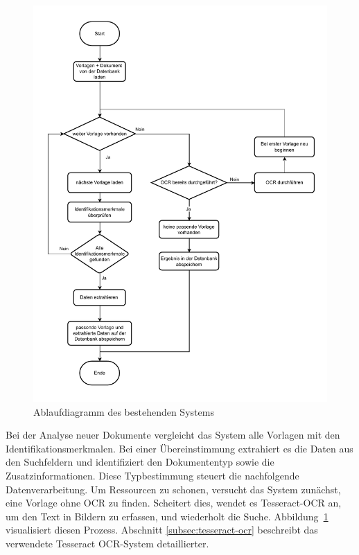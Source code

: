 \begin{figure}
	\centering
	\includegraphics[width=\textwidth]{images/AuswertungBestehendesSystem.drawio.pdf}
	\caption{Ablaufdiagramm des bestehenden Systems}
	\label{fig:auswertung-bestehendes-system}
\end{figure}

Bei der Analyse neuer Dokumente vergleicht das System alle Vorlagen mit den Identifikationsmerkmalen. Bei einer Übereinstimmung extrahiert es die Daten aus den Suchfeldern und identifiziert den Dokumententyp sowie die Zusatzinformationen. Diese Typbestimmung steuert die nachfolgende Datenverarbeitung. Um Ressourcen zu schonen, versucht das System zunächst, eine Vorlage ohne \gls{OCR} zu finden. Scheitert dies, wendet es Tesseract-\gls{OCR} an, um den Text in Bildern zu erfassen, und wiederholt die Suche. Abbildung~\ref{fig:auswertung-bestehendes-system} visualisiert diesen Prozess. Abschnitt  \ref{subsec:tesseract-ocr} beschreibt das verwendete Tesseract \gls{OCR}-System detaillierter.

